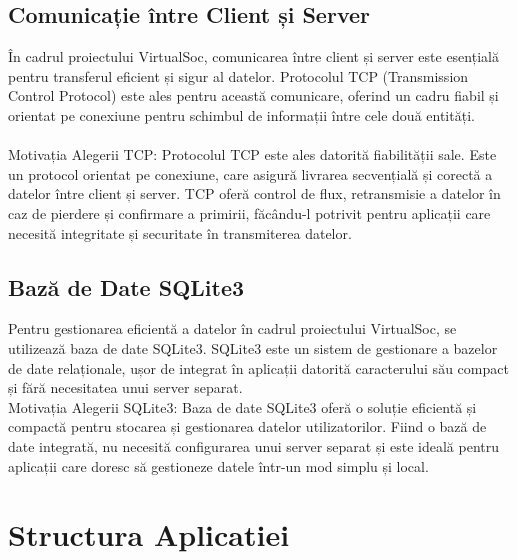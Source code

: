 \documentclass{article}
\begin{document}
\subsection{Comunicație între Client și Server}
În cadrul proiectului VirtualSoc, comunicarea între client și server este esențială pentru transferul eficient și sigur al datelor. Protocolul TCP (Transmission Control Protocol) este ales pentru această comunicare, oferind un cadru fiabil și orientat pe conexiune pentru schimbul de informații între cele două entități.
\\\\
Motivația Alegerii TCP: Protocolul TCP este ales datorită fiabilității sale. Este un protocol orientat pe conexiune, care asigură livrarea secvențială și corectă a datelor între client și server. TCP oferă control de flux, retransmisie a datelor în caz de pierdere și confirmare a primirii, făcându-l potrivit pentru aplicații care necesită integritate și securitate în transmiterea datelor.
\subsection{Bază de Date SQLite3}
Pentru gestionarea eficientă a datelor în cadrul proiectului VirtualSoc, se utilizează baza de date SQLite3. SQLite3 este un sistem de gestionare a bazelor de date relaționale, ușor de integrat în aplicații datorită caracterului său compact și fără necesitatea unui server separat.
\\
Motivația Alegerii SQLite3: Baza de date SQLite3 oferă o soluție eficientă și compactă pentru stocarea și gestionarea datelor utilizatorilor. Fiind o bază de date integrată, nu necesită configurarea unui server separat și este ideală pentru aplicații care doresc să gestioneze datele într-un mod simplu și local.
\\
\section{Structura Aplicatiei}
\end{document}
